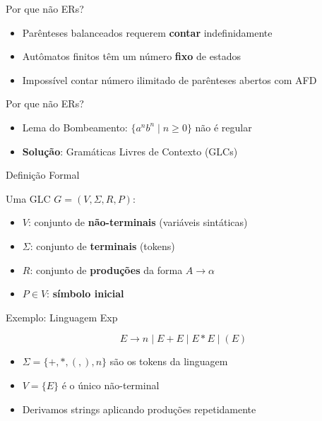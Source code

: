\begin{frame}{Por que não ERs?}

    \begin{itemize}

        \item
        Parênteses balanceados requerem \textbf{contar} indefinidamente
        \item
        Autômatos finitos têm um número \textbf{fixo} de estados
        \item
        Impossível contar número ilimitado de parênteses abertos com AFD
    \end{itemize}
\end{frame}

\begin{frame}{Por que não ERs?}

    \begin{itemize}

        \item
        Lema do Bombeamento: \(\{a^n b^n \mid n \geq 0\}\) não é regular
        \item
        \textbf{Solução}: Gramáticas Livres de Contexto (GLCs)
    \end{itemize}
\end{frame}



\begin{frame}{Definição Formal}

    Uma GLC \(G = (V, \Sigma, R, P)\):

    \begin{itemize}

        \item
        \(V\): conjunto de \textbf{não-terminais} (variáveis sintáticas)
        \item
        \(\Sigma\): conjunto de \textbf{terminais} (tokens)
        \item
        \(R\): conjunto de \textbf{produções} da forma \(A \to \alpha\)
        \item
        \(P \in V\): \textbf{símbolo inicial}
    \end{itemize}
\end{frame}

\begin{frame}{Exemplo: Linguagem Exp}

    \[E \to n \mid E + E \mid E * E \mid (E)\]

    \begin{itemize}

        \item
        \(\Sigma = \{+, *, (, ), n\}\) são os tokens da linguagem
        \item
        \(V = \{E\}\) é o único não-terminal
        \item
        Derivamos strings aplicando produções repetidamente
    \end{itemize}
\end{frame}

